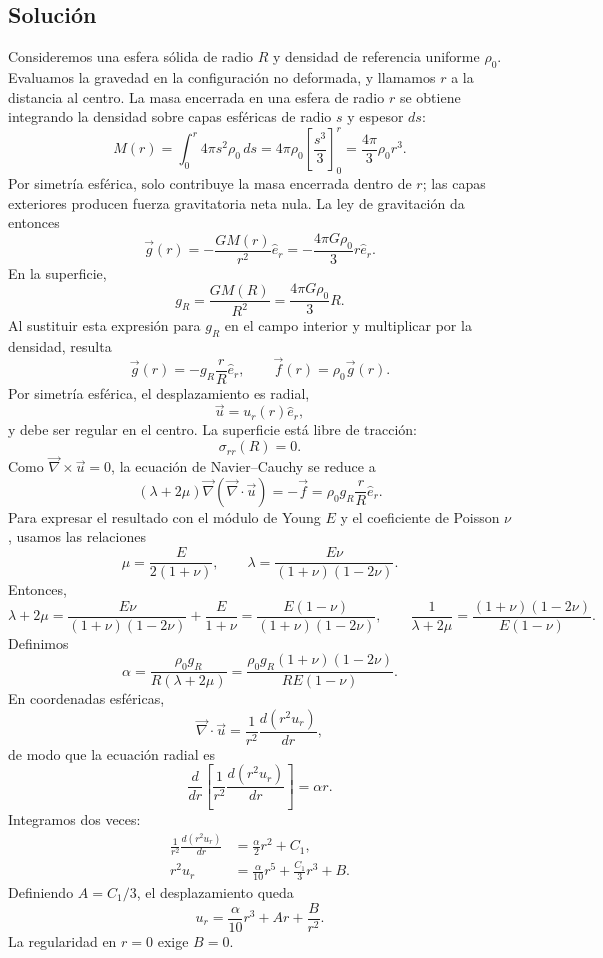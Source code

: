 \documentclass[a4paper]{article}
\begin{document}
\subsection{Solución}

Consideremos una esfera sólida de radio $R$ y densidad de referencia uniforme $\rho_0$. Evaluamos la gravedad en la configuración no deformada, y llamamos $r$ a la distancia al centro. La masa encerrada en una esfera de radio $r$ se obtiene integrando la densidad sobre capas esféricas de radio $s$ y espesor $ds$:
\[
M(r)=\int_0^r 4\pi s^2\rho_0\,ds
=4\pi\rho_0\left[\frac{s^3}{3}\right]_0^r
=\frac{4\pi}{3}\rho_0r^3.
\]
Por simetría esférica, solo contribuye la masa encerrada dentro de $r$; las capas exteriores producen fuerza gravitatoria neta nula. La ley de gravitación da entonces
\[
\vec g(r)=-\frac{GM(r)}{r^2}\hat e_r
=-\frac{4\pi G\rho_0}{3}r\hat e_r.
\]
En la superficie,
\[
g_R=\frac{GM(R)}{R^2}=\frac{4\pi G\rho_0}{3}R.
\]
Al sustituir esta expresión para $g_R$ en el campo interior y multiplicar por la densidad, resulta
\[
\boxed{\vec g(r)=-g_R\frac{r}{R}\hat e_r},
\qquad
\boxed{\vec f(r)=\rho_0\vec g(r)}.
\]
Por simetría esférica, el desplazamiento es radial,
\[
\vec u=u_r(r)\hat e_r,
\]
y debe ser regular en el centro. La superficie está libre de tracción:
\[
\sigma_{rr}(R)=0.
\]
Como $\vec\nabla\times\vec u=0$, la ecuación de Navier--Cauchy se reduce a
\[
(\lambda+2\mu)\vec\nabla(\vec\nabla\cdot\vec u)
=-\vec f
=\rho_0g_R\frac{r}{R}\hat e_r.
\]
Para expresar el resultado con el módulo de Young $E$ y el coeficiente de Poisson $\nu$, usamos las relaciones
\[
\mu=\frac{E}{2(1+\nu)},
\qquad
\lambda=\frac{E\nu}{(1+\nu)(1-2\nu)}.
\]
Entonces,
\[
\lambda+2\mu
=\frac{E\nu}{(1+\nu)(1-2\nu)}+\frac{E}{1+\nu}
=\frac{E(1-\nu)}{(1+\nu)(1-2\nu)},
\qquad
\frac{1}{\lambda+2\mu}
=\frac{(1+\nu)(1-2\nu)}{E(1-\nu)}.
\]
Definimos
\[
\alpha=\frac{\rho_0g_R}{R(\lambda+2\mu)}
=\frac{\rho_0g_R(1+\nu)(1-2\nu)}{RE(1-\nu)}.
\]
En coordenadas esféricas,
\[
\vec\nabla\cdot\vec u=\frac{1}{r^2}\frac{d(r^2u_r)}{dr},
\]
de modo que la ecuación radial es
\[
\frac{d}{dr}\left[\frac{1}{r^2}\frac{d(r^2u_r)}{dr}\right]=\alpha r.
\]
Integramos dos veces:
\[
\begin{aligned}
\frac{1}{r^2}\frac{d(r^2u_r)}{dr}
&=\frac{\alpha}{2}r^2+C_1,\\
r^2u_r&=\frac{\alpha}{10}r^5+\frac{C_1}{3}r^3+B.
\end{aligned}
\]
Definiendo $A=C_1/3$, el desplazamiento queda
\[
u_r=\frac{\alpha}{10}r^3+Ar+\frac{B}{r^2}.
\]
La regularidad en $r=0$ exige $B=0$.
\end{document}
